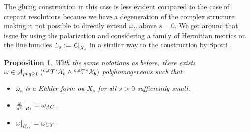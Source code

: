 \documentclass[a4paper,11pt]{article}
\newcounter{mythm}[section]
\newtheorem{pr}[mythm]{Proposition}
\newcommand\restr[2]{{%
  \left.\kern-\nulldelimiterspace %
  #1 %
  \littletaller %
  \right|_{#2} %
  }}
\newcommand{\littletaller}{\mathchoice{\vphantom{\big|}}{}{}{}}
\begin{document}
The gluing construction in this case is less evident compared to the case of crepant resolutions because we have a degeneration of the complex structure making it not possible to directly extend $\omega_C$ above $s =0$. We get around that issue by using the polarization and considering a family of Hermitian metrics on the line bundles $L_{s} := \restr{\mathcal{L}}{X_s}$ in a similar way to the construction by Spotti \cite{Spotti}.  
\begin{pr}
    With the same notations as before, there exists $\omega \in \mathcal{A}_{phg \geq 0} \left( \hspace{0.01cm} ^{c,\varepsilon} T^{*} \mathcal{X}_b \wedge \hspace{0.01cm} ^{c,\varepsilon} T^{*} \mathcal{X}_b \right)$ polyhomogeneous such that 
    \begin{itemize}
 \item $\omega_s$ is a Kähler form on $X_s$ for all $s >0$ sufficiently small. 
        \item $\restr{\frac{\omega}{s^2}}{B_I} = \omega_{AC}$.
        \item $\restr{\omega}{B_{II}} = \omega_{CY}$.
    \end{itemize}
\end{pr}
\end{document}
